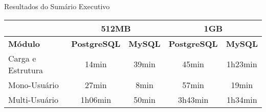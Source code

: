 \begin{quadro}[H]
    \centering
    \caption{Resultados do Sumário Executivo
    \label{quadro:comparisonMySql}}
\begin{tabular}{l|c|c|c|c|}
\cline{2-5}
 & \multicolumn{2}{c|}{\textbf{512MB}} & \multicolumn{2}{c|}{\textbf{1GB}} \\ \hline
\multicolumn{1}{|l|}{\textbf{Módulo}} & \textbf{PostgreSQL} & \textbf{MySQL} & \textbf{PostgreSQL} & \textbf{MySQL} \\ \hline
\multicolumn{1}{|l|}{Carga e Estrutura} & 14min & 39min & 45min & 1h23min \\ \hline
\multicolumn{1}{|l|}{Mono-Usuário} & 27min & 8min & 57min & 19min \\ \hline
\multicolumn{1}{|l|}{Multi-Usuário} & 1h06min & 50min & 3h43min & 1h34min \\ \hline
\end{tabular}
\end{quadro}

